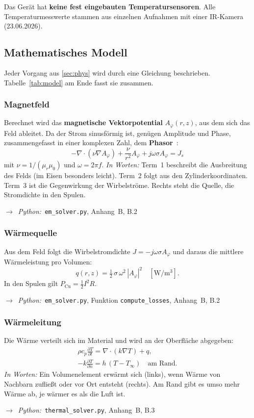 \documentclass[a4paper, 10pt, conference]{ieeeconf}
\newcommand{\py}[1]{\par{\raggedright\noindent$\rightarrow$~\textit{Python:}~#1\par}\smallskip}
\begin{document}
Das Gerät hat \textbf{keine fest eingebauten Temperatursensoren}. Alle
Temperaturmesswerte stammen aus einzelnen Aufnahmen mit einer IR-Kamera
(23.06.2026).

\subsection{Mathematisches Modell}
\label{sec:math}

Jeder Vorgang aus \ref{sec:phys} wird durch eine Gleichung beschrieben.
Tabelle~\ref{tab:model} am Ende fasst sie zusammen.

\subsubsection{Magnetfeld}
Berechnet wird das \textbf{magnetische Vektorpotential} $A_\varphi(r,z)$, aus
dem sich das Feld ableitet. Da der Strom sinusförmig ist, genügen Amplitude
und Phase, zusammengefasst in einer komplexen Zahl, dem
\textbf{Phasor}~\cite{biro1989vectorpotential}:
\begin{equation}
-\nabla\cdot(\nu\nabla A_\varphi) + \frac{\nu}{r^2}A_\varphi + j\omega\sigma A_\varphi = J_s
\label{eq:em}
\end{equation}
mit $\nu=1/(\mu_r\mu_0)$ und $\omega = 2\pi f$.
\textit{In Worten:} Term~1 beschreibt die Ausbreitung des Felds (im Eisen
besonders leicht). Term~2 folgt aus den Zylinderkoordinaten. Term~3 ist die
Gegenwirkung der Wirbelströme. Rechts steht die Quelle, die Stromdichte in
den Spulen.
\py{\texttt{em\_solver.py}, Anhang~B, B.2}

\subsubsection{Wärmequelle}
Aus dem Feld folgt die Wirbelstromdichte $J = -j\omega\sigma A_\varphi$ und
daraus die mittlere Wärmeleistung pro Volumen:
\begin{equation}
q(r,z) = \tfrac12\,\sigma\,\omega^2\,|A_\varphi|^2 \quad[\mathrm{W/m^3}].
\label{eq:q}
\end{equation}
In den Spulen gilt $P_{\mathrm{Cu}}=\tfrac12 I^2R$.
\py{\texttt{em\_solver.py}, Funktion \texttt{compute\_losses}, Anhang~B, B.2}

\subsubsection{Wärmeleitung}
Die Wärme verteilt sich im Material und wird an der Oberfläche abgegeben:
\begin{equation}
\begin{gathered}
\rho c_p\frac{\partial T}{\partial t}=\nabla\cdot(k\nabla T)+q,\\
-k\frac{\partial T}{\partial n}=h\,(T-T_\infty)\quad\text{am Rand.}
\end{gathered}
\label{eq:heat}
\end{equation}
\textit{In Worten:} Ein Volumenelement erwärmt sich (links), wenn Wärme von
Nachbarn zufließt oder vor Ort entsteht (rechts). Am Rand gibt es umso mehr
Wärme ab, je wärmer es als die Luft ist.
\py{\texttt{thermal\_solver.py}, Anhang~B, B.3}
\end{document}
